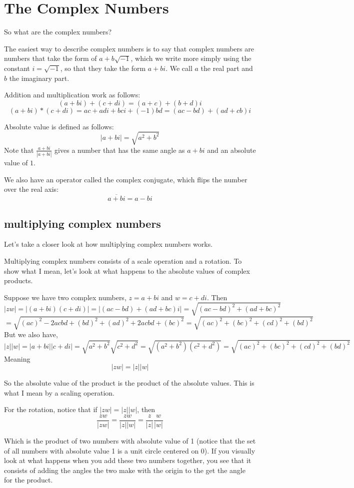\documentclass[11pt, oneside]{article}   	%
\begin{document}
\section{The Complex Numbers}

So what are the complex numbers? 

The easiest way to describe complex numbers is to say that complex numbers are numbers that take the form of $a+b\sqrt{-1}$, which we write more simply using the constant $i=\sqrt{-1}$, so that they take the form $a+bi$.
We call $a$ the real part and $b$ the imaginary part.

Addition and multiplication work as follows:
$$(a+bi) + (c+di) = (a+c) + (b+d)i$$
$$(a+bi) * (c+di) = ac + adi + bci + (-1)bd= (ac-bd) + (ad+cb)i$$

Absolute value is defined as follows:
$$|a+bi| = \sqrt{a^2+b^2}$$
Note that $\frac{a+bi}{|a+bi|}$ gives a number that has the same angle as $a+bi$ and an absolute value of $1$. 

We also have an operator called the complex conjugate, which flips the number over the real axis:
$$\overline{a+bi} = a-bi$$

\subsection{multiplying complex numbers}
Let's take a closer look at how multiplying complex numbers works.

Multiplying complex numbers consists of a scale operation and a rotation.
To show what I mean, let's look at what happens to the absolute values of complex products.

Suppose we have two complex numbers, $z=a+bi$ and $w=c+di$.
Then \[|zw| = |(a+bi)(c+di)| = |(ac-bd) + (ad+bc)i| = \sqrt{(ac-bd)^2 + (ad+bc)^2}\]
 \[=\sqrt{(ac)^2 - 2acbd + (bd)^2  + (ad)^2 + 2acbd + (bc)^2} = \sqrt{(ac)^2+(bc)^2+(cd)^2+(bd)^2}\]
 But we also have,
 \[|z||w|=|a+bi||c+di|=\sqrt{a^2+b^2}\sqrt{c^2+d^2}=\sqrt{(a^2+b^2)(c^2+d^2)}=\sqrt{(ac)^2+(bc)^2+(cd)^2+(bd)^2}\]
 Meaning\[|zw|=|z||w|\]

So the absolute value of the product is the product of the absolute values. This is what I mean by a scaling operation.

For the rotation, notice that if \(|zw|=|z||w|\), then
\[\frac{zw}{|zw|}=\frac{zw}{|z||w|}=\frac{z}{|z|}\frac{w}{|w|}\]

Which is the product of two numbers with absolute value of 1 (notice that the set of all numbers with absolute value 1 is a unit circle centered on 0). If you visually look at what happens when you add these two numbers together, you see that it consists of adding the angles the two make with the origin to the get the angle for the product.
\end{document}
